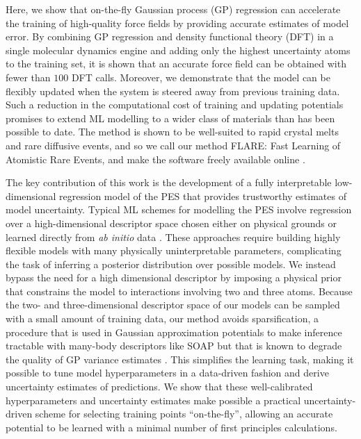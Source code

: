 \documentclass[%
superscriptaddress,
preprint,
linenumbers,
amsmath,amssymb,
aps,
prl,
]{revtex4-1}
\begin{document}
Here, we show that on-the-fly Gaussian process (GP) regression can accelerate the training of high-quality force fields by providing accurate estimates of model error. By combining GP regression and density functional theory (DFT) in a single molecular dynamics engine and adding only the highest uncertainty atoms to the training set, it is shown that an accurate force field can be obtained with fewer than $100$ DFT calls. Moreover, we demonstrate that the model can be flexibly updated when the system is steered away from previous training data. Such a reduction in the computational cost of training and updating potentials promises to extend ML modelling to a wider class of materials than has been possible to date. The method is shown to be well-suited to rapid crystal melts and rare diffusive events, and so we call our method FLARE: Fast Learning of Atomistic Rare Events, and make the software freely available online \cite{flare}.

The key contribution of this work is the development of a fully interpretable low-dimensional regression model of the PES that provides trustworthy estimates of model uncertainty. Typical ML schemes for modelling the PES involve regression over a high-dimensional descriptor space chosen either on physical grounds \cite{behler2011atom, bartok2013representing} or learned directly from \textit{ab initio} data \cite{schutt2017schnet, zhang2018end}. These approaches require building highly flexible models with many physically uninterpretable parameters, complicating the task of inferring a posterior distribution over possible models. We instead bypass the need for a high dimensional descriptor by imposing a physical prior that constrains the model to interactions involving two and three atoms. Because the two- and three-dimensional descriptor space of our models can be sampled with a small amount of training data, our method avoids sparsification, a procedure that is used in Gaussian approximation potentials to make inference tractable with many-body descriptors like SOAP \cite{bartok2010gaussian, bartok2013representing, bartok2015gaussian} but that is known to degrade the quality of GP variance estimates \cite{rasmussen2003gaussian}. This simplifies the learning task, making it possible to tune model hyperparameters in a data-driven fashion and derive uncertainty estimates of predictions. We show that these well-calibrated hyperparameters and uncertainty estimates make possible a practical uncertainty-driven scheme for selecting training points ``on-the-fly'', allowing an accurate potential to be learned with a minimal number of first principles calculations.
\end{document}
